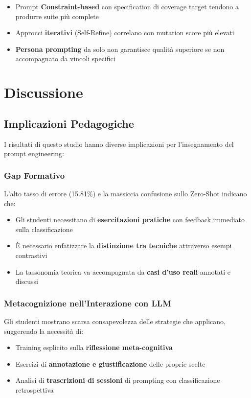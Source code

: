 \documentclass[a4paper,12pt]{article}
\begin{document}
\begin{itemize}
    \item Prompt \textbf{Constraint-based} con specification di coverage target tendono a produrre suite più complete
    \item Approcci \textbf{iterativi} (Self-Refine) correlano con mutation score più elevati
    \item \textbf{Persona prompting} da solo non garantisce qualità superiore se non accompagnato da vincoli specifici
\end{itemize}

\section{Discussione}

\subsection{Implicazioni Pedagogiche}
I risultati di questo studio hanno diverse implicazioni per l'insegnamento del prompt engineering:

\subsubsection{Gap Formativo}
L'alto tasso di errore (15.81\%) e la massiccia confusione sullo Zero-Shot indicano che:
\begin{itemize}
    \item Gli studenti necessitano di \textbf{esercitazioni pratiche} con feedback immediato sulla classificazione
    \item È necessario enfatizzare la \textbf{distinzione tra tecniche} attraverso esempi contrastivi
    \item La tassonomia teorica va accompagnata da \textbf{casi d'uso reali} annotati e discussi
\end{itemize}

\subsubsection{Metacognizione nell'Interazione con LLM}
Gli studenti mostrano scarsa consapevolezza delle strategie che applicano, suggerendo la necessità di:
\begin{itemize}
    \item Training esplicito sulla \textbf{riflessione meta-cognitiva}
    \item Esercizi di \textbf{annotazione e giustificazione} delle proprie scelte
    \item Analisi di \textbf{trascrizioni di sessioni} di prompting con classificazione retrospettiva
\end{itemize}
\end{document}
